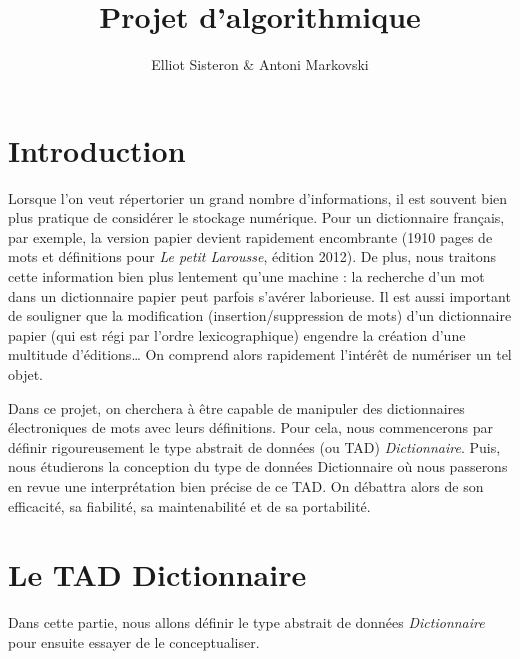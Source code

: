 \documentclass[a4paper, titlepage]{livret} %
\title{Projet d'algorithmique} %
\author{Elliot Sisteron & Antoni Markovski} %
\begin{document}

	
	\chapter*{Introduction}
		Lorsque l'on veut répertorier un \og grand \fg{} nombre d'informations, il est souvent bien plus pratique de considérer le stockage numérique.
		Pour un dictionnaire français, par exemple, la version papier devient rapidement encombrante (1910 pages de mots et définitions pour \textit{Le petit Larousse}, édition 2012).
		De plus, nous traitons cette information bien plus lentement qu'une machine : la recherche d'un mot dans un dictionnaire papier peut parfois s'avérer laborieuse.
		Il est aussi important de souligner que la modification (insertion/suppression de mots) d'un dictionnaire papier (qui est régi par l'ordre lexicographique) engendre la création d'une multitude d'éditions…
		On comprend alors rapidement l'intérêt de \og numériser \fg{} un tel objet.
		
		Dans ce projet, on cherchera à être capable de manipuler des dictionnaires électroniques de mots avec leurs définitions.
		Pour cela, nous commencerons par définir rigoureusement le type abstrait de données (ou TAD) \textit{Dictionnaire}.
		Puis, nous étudierons la conception du type de données Dictionnaire où nous passerons en revue une interprétation bien précise de ce TAD.
		On débattra alors de son efficacité, sa fiabilité, sa maintenabilité et de sa portabilité.

	\setcounter{tocdepth}{2} %
	\tableofcontents %
	
	\chapter{Le TAD Dictionnaire}
		Dans cette partie, nous allons définir le type abstrait de données \textit{Dictionnaire} pour ensuite essayer de le conceptualiser.
\end{document}
